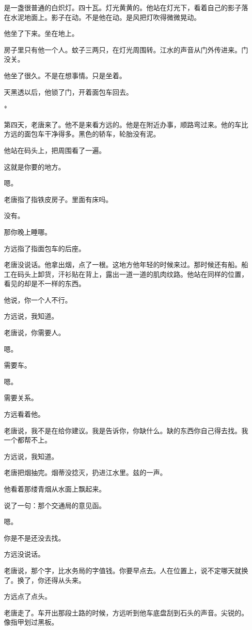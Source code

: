 \documentclass[UTF8,a5paper,11pt,openany]{ctexbook}
\newcommand{\scene}{\vspace{1em}\begin{center}*\quad*\quad*\end{center}\vspace{0.5em}}
\begin{document}
是一盏很普通的白炽灯。四十瓦。灯光黄黄的。他站在灯光下，看着自己的影子落在水泥地面上。影子在动。不是他在动。是风把灯吹得微微晃动。

他坐了下来。坐在地上。

房子里只有他一个人。蚊子三两只，在灯光周围转。江水的声音从门外传进来。门没关。

他坐了很久。不是在想事情。只是坐着。

天黑透以后，他锁了门，开着面包车回去。


\scene

第四天，老唐来了。他不是来看方远的。他是在附近办事，顺路弯过来。他的车比方远的面包车干净得多。黑色的轿车，轮胎没有泥。

他站在码头上，把周围看了一遍。

这就是你要的地方。

嗯。

老唐指了指铁皮房子。里面有床吗。

没有。

那你晚上睡哪。

方远指了指面包车的后座。

老唐没说话。他拿出烟，点了一根。这地方他年轻的时候来过。那时候还有船。船工在码头上卸货，汗衫贴在背上，露出一道一道的肌肉纹路。他站在同样的位置，看见的却是不一样的东西。

他说，你一个人不行。

方远说，我知道。

老唐说，你需要人。

嗯。

需要车。

嗯。

需要关系。

方远看着他。

老唐说，我不是在给你建议。我是告诉你，你缺什么。缺的东西你自己得去找。我一个都帮不上。

方远说，我知道。

老唐把烟抽完。烟蒂没捻灭，扔进江水里。兹的一声。

他看着那缕青烟从水面上飘起来。

说了一句：那个交通局的意见函。

嗯。

你是不是还没去找。

方远没说话。

老唐说，那个字，比水务局的字值钱。你要早点去。人在位置上，说不定哪天就换了。换了，你还得从头来。

方远点了点头。

老唐走了。车开出那段土路的时候，方远听到他车底盘刮到石头的声音。尖锐的。像指甲划过黑板。
\end{document}
